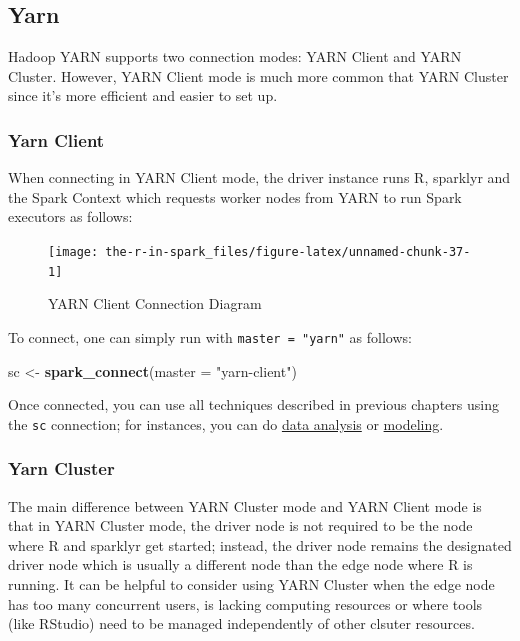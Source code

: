 \documentclass[]{book}
\newenvironment{Shaded}{\begin{snugshade}}{\end{snugshade}}
\newcommand{\DataTypeTok}[1]{\textcolor[rgb]{0.13,0.29,0.53}{#1}}
\newcommand{\KeywordTok}[1]{\textcolor[rgb]{0.13,0.29,0.53}{\textbf{#1}}}
\newcommand{\NormalTok}[1]{#1}
\newcommand{\StringTok}[1]{\textcolor[rgb]{0.31,0.60,0.02}{#1}}
\theoremstyle{definition}
\theoremstyle{definition}
\theoremstyle{definition}
\theoremstyle{remark}
\begin{document}
\hypertarget{yarn-1}{%
\subsection{Yarn}\label{yarn-1}}

Hadoop YARN supports two connection modes: YARN Client and YARN Cluster.
However, YARN Client mode is much more common that YARN Cluster since
it's more efficient and easier to set up.

\hypertarget{yarn-client}{%
\subsubsection{Yarn Client}\label{yarn-client}}

When connecting in YARN Client mode, the driver instance runs R,
sparklyr and the Spark Context which requests worker nodes from YARN to
run Spark executors as follows:

\begin{figure}

{\centering \texttt{[image: the-r-in-spark\_files/figure-latex/unnamed-chunk-37-1]} 

}

\caption{YARN Client Connection Diagram}\label{fig:unnamed-chunk-37}
\end{figure}

To connect, one can simply run with \texttt{master\ =\ "yarn"} as
follows:

\begin{Shaded}
\begin{Highlighting}[]
\NormalTok{sc <-}\StringTok{ }\KeywordTok{spark_connect}\NormalTok{(}\DataTypeTok{master =} \StringTok{"yarn-client"}\NormalTok{)}
\end{Highlighting}
\end{Shaded}

Once connected, you can use all techniques described in previous
chapters using the \texttt{sc} connection; for instances, you can do
\href{analysis}{data analysis} or
\protect\hyperlink{modeling}{modeling}.

\hypertarget{yarn-cluster}{%
\subsubsection{Yarn Cluster}\label{yarn-cluster}}

The main difference between YARN Cluster mode and YARN Client mode is
that in YARN Cluster mode, the driver node is not required to be the
node where R and sparklyr get started; instead, the driver node remains
the designated driver node which is usually a different node than the
edge node where R is running. It can be helpful to consider using YARN
Cluster when the edge node has too many concurrent users, is lacking
computing resources or where tools (like RStudio) need to be managed
independently of other clsuter resources.
\end{document}
